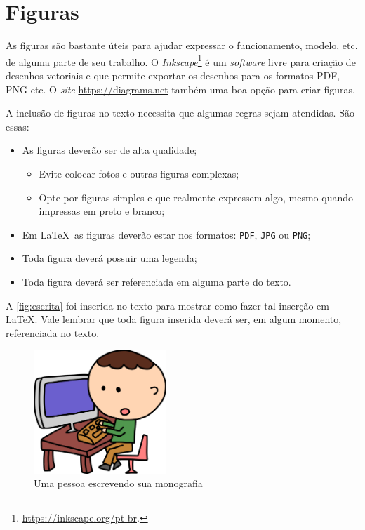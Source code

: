 \section{Figuras}\label{sec:figuras}

As figuras são bastante úteis para ajudar expressar o funcionamento, modelo, etc. de alguma parte de seu trabalho. O \textit{Inkscape}\footnote{\url{https://inkscape.org/pt-br}.} é um \textit{software} livre para criação de desenhos vetoriais e que permite exportar os desenhos para os formatos PDF, PNG etc. O \textit{site} \url{https://diagrams.net} também uma boa opção para criar figuras.

A inclusão de figuras no texto necessita que algumas regras sejam atendidas. São essas:

\begin{itemize}
	\item As figuras deverão ser de alta qualidade;
	\begin{itemize}
		\item Evite colocar fotos e outras figuras complexas;
		\item Opte por figuras simples e que realmente expressem algo, mesmo quando impressas em preto e branco;
	\end{itemize}
	\item Em \LaTeX~as figuras deverão estar nos formatos: \texttt{PDF}, \texttt{JPG} ou \texttt{PNG};
	\item Toda figura deverá possuir uma legenda;
	\item Toda figura deverá ser referenciada em alguma parte do texto.
\end{itemize}

A \autoref{fig:escrita} foi inserida no texto para mostrar como fazer tal inserção em \LaTeX. Vale lembrar que toda figura inserida deverá ser, em algum momento, referenciada no texto. 

\begin{figure}[ht]
	\centering
	\caption{Uma pessoa escrevendo sua monografia}\label{fig:escrita}
	\includegraphics[width=5cm]{figuras/man}
\end{figure}


